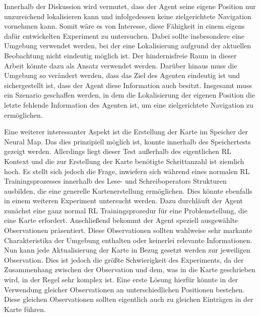 Innerhalb der Diskussion wird vermutet, dass der Agent seine eigene Position nur unzureichend lokalisieren kann und infolgedessen keine zielgerichtete Navigation vornehmen kann. Somit wäre es von Interesse, diese Fähigkeit in einem eigens dafür entwickelten Experiment zu untersuchen. Dabei sollte insbesondere eine Umgebung verwendet werden, bei der eine Lokalisierung aufgrund der aktuellen Beobachtung nicht eindeutig möglich ist. Der hindernisfreie Raum in dieser Arbeit könnte dazu als Ansatz verwendet werden. Darüber hinaus muss die Umgebung so verändert werden, dass das Ziel des Agenten eindeutig ist und sichergestellt ist, dass der Agent diese Information auch besitzt. Insgesamt muss ein Szenario geschaffen werden, in dem die Lokalisierung der eigenen Position die letzte fehlende Information des Agenten ist, um eine zielgerichtete Navigation zu ermöglichen.

Eine weiterer interessanter Aspekt ist die Erstellung der Karte im Speicher der Neural Map. Das dies prinzipiell möglich ist, konnte innerhalb des Speichertests gezeigt werden. Allerdings liegt dieser Test außerhalb des eigentlichen RL Kontext und die zur Erstellung der Karte benötigte Schrittanzahl ist ziemlich hoch. Es stellt sich jedoch die Frage, inwiefern sich während eines normalen RL Trainingsprozesses innerhalb des Lese- und Schreiboperators Strukturen ausbilden, die eine generelle Kartenerstellung ermöglichen. Dies könnte ebenfalls in einem weiteren Experiment untersucht werden. Dazu durchläuft der Agent zunächst eine ganz normal RL Trainingsprozedur für eine Problemstellung, die eine Karte erfordert. Anschließend bekommt der Agent speziell ausgewählte Observationen präsentiert. Diese Observationen sollten wahlweise sehr markante Charakteristika der Umgebung enthalten oder keinerlei relevante Informationen. Nun kann jede Aktualisierung der Karte in Bezug gesetzt werden zur jeweiligen Observation. Dies ist jedoch die größte Schwierigkeit des Experiments, da der Zusammenhang zwischen der Observation und dem, was in die Karte geschrieben wird, in der Regel sehr komplex ist. Eine erste Lösung hierfür könnte in der Verwendung gleicher Observationen an unterschiedlichen Positionen bestehen. Diese gleichen Observationen sollten eigentlich auch zu gleichen Einträgen in der Karte führen.
